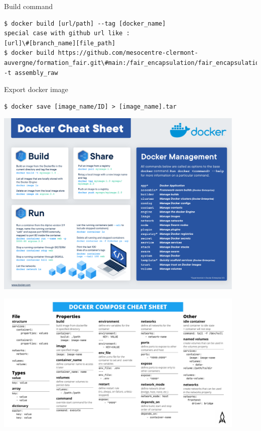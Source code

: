 \begin{frame}[fragile]{Build command}
\begin{verbatim}
$ docker build [url/path] --tag [docker_name]
special case with github url like :
[url]\#[branch_name][file_path]
$ docker build https://github.com/mesocentre-clermont-auvergne/formation_fair.git\#main:/fair_encapsulation/fair_encapsulation_TP/fair_encapsulation_containers/fair_encapsulation_docker/docker_assembly_raw -t assembly_raw
\end{verbatim}
\end{frame}


\begin{frame}[fragile]{Export docker image}
\begin{verbatim}
$ docker save [image_name/ID] > [image_name].tar
\end{verbatim}
\end{frame}

\begin{frame}
\centering\includegraphics[width=0.9\textwidth]{images/docker-cheat-sheet.pdf}
\end{frame}

\begin{frame}
\centering\includegraphics[width=0.9\textwidth]{images/docker-compose-cheat-sheet.pdf}
\end{frame}

